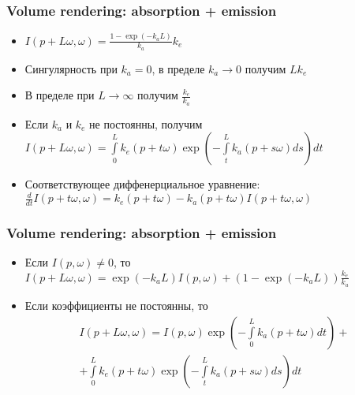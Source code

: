 \documentclass[10pt]{beamer}
\begin{document}
\begin{frame}[fragile]
\frametitle{Volume rendering: absorption + emission}
\begin{itemize}
\item \begin{math}I(p+L\omega,\omega) = \frac{1 - \exp(-k_a L)}{k_a} k_e\end{math}
\pause
\item Сингулярность при \begin{math}k_a = 0\end{math}, в пределе \begin{math}k_a \rightarrow 0\end{math} получим \begin{math}L k_e\end{math}
\pause
\item В пределе при \begin{math}L \rightarrow \infty\end{math} получим \begin{math}\frac{k_e}{k_a}\end{math}
\pause
\item Если \begin{math}k_a\end{math} и \begin{math}k_e\end{math} не постоянны, получим \begin{math}I(p+L\omega,\omega) = \int\limits_0^L k_e(p+t\omega) \exp\left( -\int\limits_t^L k_a(p+s\omega)ds \right)dt\end{math}
\pause
\item Соответствующее диффенерциальное уравнение: \begin{math}\frac{d}{dt}I(p+t\omega,\omega) = k_e(p+t\omega) - k_a(p+t\omega) I(p+t\omega,\omega)\end{math}
\end{itemize}
\end{frame}

\begin{frame}[fragile]
\frametitle{Volume rendering: absorption + emission}
\begin{itemize}
\item Если \begin{math}I(p,\omega) \neq 0\end{math}, то \begin{math}I(p+L\omega,\omega) = \exp(-k_a L)I(p,\omega) + (1 - \exp(-k_a L))\frac{k_e}{k_a}\end{math}
\pause
\item Если коэффициенты не постоянны, то \begin{multline}I(p+L\omega,\omega) = I(p,\omega)\exp\left(-\int\limits_0^L k_a(p+t\omega)dt\right) +\\
+ \int\limits_0^L k_e(p+t\omega) \exp\left( -\int\limits_t^L k_a(p+s\omega)ds \right)dt\end{multline}
\end{itemize}
\end{frame}
\end{document}
